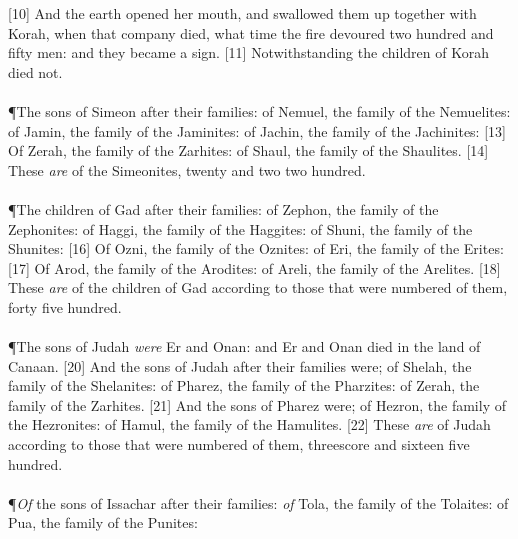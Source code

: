 [10] \textcolor[cmyk]{0.99998,1,0,0}{And the earth opened her mouth, and swallowed them up together with Korah, when that company died, what time the fire devoured two hundred and fifty men: and they became a sign.}
[11] \textcolor[cmyk]{0.99998,1,0,0}{Notwithstanding the children of Korah died not.}\\
\\
\P \textcolor[cmyk]{0.99998,1,0,0}{The sons of Simeon after their families: of Nemuel, the family of the Nemuelites: of Jamin, the family of the Jaminites: of Jachin, the family of the Jachinites:}
[13] \textcolor[cmyk]{0.99998,1,0,0}{Of Zerah, the family of the Zarhites: of Shaul, the family of the Shaulites.}
[14] \textcolor[cmyk]{0.99998,1,0,0}{These \emph{are}  of the Simeonites, twenty and two  two hundred.}\\
\\
\P \textcolor[cmyk]{0.99998,1,0,0}{The children of Gad after their families: of Zephon, the family of the Zephonites: of Haggi, the family of the Haggites: of Shuni, the family of the Shunites:}
[16] \textcolor[cmyk]{0.99998,1,0,0}{Of Ozni, the family of the Oznites: of Eri, the family of the Erites:}
[17] \textcolor[cmyk]{0.99998,1,0,0}{Of Arod, the family of the Arodites: of Areli, the family of the Arelites.}
[18] \textcolor[cmyk]{0.99998,1,0,0}{These \emph{are}  of the children of Gad according to those that were numbered of them, forty  five hundred.}\\
\\
\P \textcolor[cmyk]{0.99998,1,0,0}{The sons of Judah \emph{were} Er and Onan: and Er and Onan died in the land of Canaan.}
[20] \textcolor[cmyk]{0.99998,1,0,0}{And the sons of Judah after their families were; of Shelah, the family of the Shelanites: of Pharez, the family of the Pharzites: of Zerah, the family of the Zarhites.}
[21] \textcolor[cmyk]{0.99998,1,0,0}{And the sons of Pharez were; of Hezron, the family of the Hezronites: of Hamul, the family of the Hamulites.}
[22] \textcolor[cmyk]{0.99998,1,0,0}{These \emph{are}  of Judah according to those that were numbered of them, threescore and sixteen  five hundred.}\\
\\
\P \textcolor[cmyk]{0.99998,1,0,0}{\emph{Of} the sons of Issachar after their families: \emph{of} Tola, the family of the Tolaites: of Pua, the family of the Punites:}
